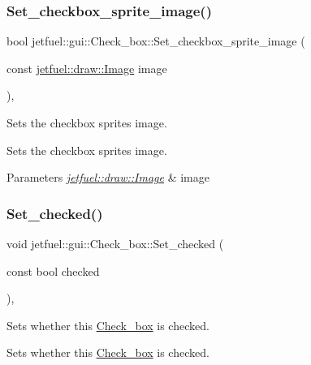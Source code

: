 \subsubsection{\texorpdfstring{Set\+\_\+checkbox\+\_\+sprite\+\_\+image()}{Set\_checkbox\_sprite\_image()}}
{\footnotesize\ttfamily bool jetfuel\+::gui\+::\+Check\+\_\+box\+::\+Set\+\_\+checkbox\+\_\+sprite\+\_\+image (\begin{DoxyParamCaption}\item[{const \hyperlink{classjetfuel_1_1draw_1_1Image}{jetfuel\+::draw\+::\+Image}}]{image }\end{DoxyParamCaption})\hspace{0.3cm}{\ttfamily [inline]}, {\ttfamily [protected]}}



Sets the checkbox sprite\textquotesingle{}s image. 

Sets the checkbox sprite\textquotesingle{}s image.


\begin{DoxyParams}{Parameters}
{\em \hyperlink{classjetfuel_1_1draw_1_1Image}{jetfuel\+::draw\+::\+Image}} & image \\
\hline
\end{DoxyParams}
\mbox{\label{classjetfuel_1_1gui_1_1Check__box_ac422c99da29eab41b4849d6d0a55ff70}} 
\subsubsection{\texorpdfstring{Set\+\_\+checked()}{Set\_checked()}}
{\footnotesize\ttfamily void jetfuel\+::gui\+::\+Check\+\_\+box\+::\+Set\+\_\+checked (\begin{DoxyParamCaption}\item[{const bool}]{checked }\end{DoxyParamCaption})\hspace{0.3cm}{\ttfamily [inline]}, {\ttfamily [protected]}}



Sets whether this \hyperlink{classjetfuel_1_1gui_1_1Check__box}{Check\+\_\+box} is checked. 

Sets whether this \hyperlink{classjetfuel_1_1gui_1_1Check__box}{Check\+\_\+box} is checked.


